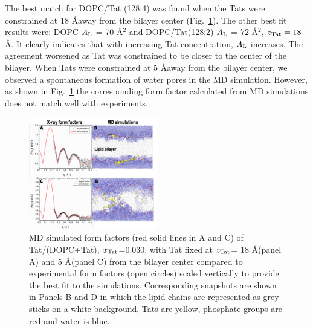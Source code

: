 
The best match for DOPC/Tat (128:4) was found when the Tats were 
constrained at 18 \AA away from the bilayer center (Fig.~\ref{fig:figure4}). The other 
best fit results were: DOPC $A_\textrm{L}$ = 70 \AA$^2$ and DOPC/Tat(128:2) $A_\textrm{L}$ = 72 
\AA$^2$, $z_\textrm{Tat} = 18$ \AA. It clearly indicates that with increasing Tat
concentration, $A_\textrm{L}$ increases. The agreement worsened as Tat was constrained 
to be closer to the
center of the bilayer. When Tats were constrained at 5 \AA away from the bilayer 
center, we
observed a spontaneous formation of water pores in the MD simulation. However, 
as shown in
Fig.~\ref{fig:figure4} the corresponding form factor calculated from MD simulations does not 
match well
with experiments.

\begin{figure}[htbp]
  \centering
  \includegraphics[width=0.5\textwidth]{figures/Tat/figure4}
  \caption{MD simulated form factors (red solid lines in A and C) of Tat/(DOPC+Tat), $x_\textrm{Tat}$=0.030,
  with Tat fixed at $z_\textrm{Tat}$= 18 \AA (panel A) and 5 \AA (panel C) from the bilayer center compared to
  experimental form factors (open circles) scaled vertically to provide the best fit to the
  simulations. Corresponding snapshots are shown in Panels B and D in which the lipid chains are
  represented as grey sticks on a white background, Tats are yellow, phosphate groups are red and
  water is blue.}
  \label{fig:figure4}
\end{figure}

